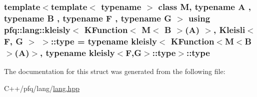 \subsubsection[{\texorpdfstring{type}{type}}]{\setlength{\rightskip}{0pt plus 5cm}template$<$template$<$ typename $>$ class M, typename A , typename B , typename F , typename G $>$ using {\bf pfq\+::lang\+::kleisly}$<$ {\bf K\+Function}$<$ M$<$ B $>$(A) $>$, {\bf Kleisli}$<$ F, G $>$ $>$\+::{\bf type} =  typename {\bf kleisly}$<$ {\bf K\+Function}$<$M$<$B$>$(A)$>$, typename {\bf kleisly}$<$F,G$>$\+::{\bf type}$>$\+::{\bf type}}\hypertarget{structpfq_1_1lang_1_1kleisly_3_01KFunction_3_01M_3_01B_01_4_07A_08_01_4_00_01Kleisli_3_01F_00_01G_01_4_01_4_a0d400d4878fb63c2dd734b642e395020}{}\label{structpfq_1_1lang_1_1kleisly_3_01KFunction_3_01M_3_01B_01_4_07A_08_01_4_00_01Kleisli_3_01F_00_01G_01_4_01_4_a0d400d4878fb63c2dd734b642e395020}


The documentation for this struct was generated from the following file\+:\begin{DoxyCompactItemize}
\item 
C++/pfq/lang/\hyperlink{lang_8hpp}{lang.\+hpp}\end{DoxyCompactItemize}
